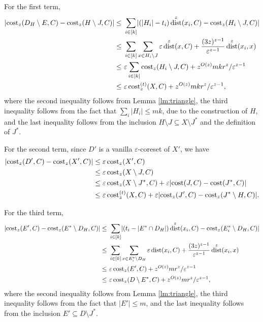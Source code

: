 \documentclass[11pt,letterpaper]{article}
\theoremstyle{definition}
\newcommand{\eps}{\varepsilon}
\DeclareMathOperator{\dist}{dist}
\DeclarePairedDelimiter{\abs}{\lvert}{\rvert}
\begin{document}
	For the first term, 
	\begin{align*}
	\abs{\cost_z(D_H\setminus E, C) - \cost_z(H\setminus J, C)}
	\leq & \ \sum_{i\in [k]} \abs{(|H_i|-t_i)\dist^z(x_i, C) - \cost_z(H_i\setminus J, C)} \\
    \leq & \ \sum_{i\in [k]} \sum_{x\in H_i\setminus J} \eps \dist^z(x, C) + \frac{(3z)^{z-1}}{\eps^{z-1}} \dist^z(x_i, x) \\
	\leq & \ \eps \sum_{i\in [k]} \cost_z(H_i\setminus J, C) + z^{O(z)} m k r^z/\eps^{z-1} \\
     \leq & \ \eps \cost[t]_z(X, C) + z^{O(z)} m k r^z/\eps^{z-1},
	\end{align*}
	where the second inequality follows from Lemma \ref{lm:triangle}, the third inequality follows from the fact that \(\sum_i |H_i| \leq mk\), due to the construction of \(H\), and the last inequality follows from the inclusion \(H\setminus J \subseteq X\setminus J^\ast\) and the definition of \(J^\ast\).

    For the second term, since $D'$ is a vanilla $\eps$-coreset of $X'$, we have
	\begin{align*}
		\abs{\cost_z(D', C) - \cost_z(X',C)} 
		&\leq \eps \cost_z(X', C) \\
		&\leq \eps \cost_z(X\setminus J, C) \\
		&\leq \eps \cost_z(X\setminus J^\ast, C) + \eps\abs{ \cost(J, C) - \cost(J^\ast, C) } \\
		&\leq \eps \cost[t]_z(X, C) + \eps\abs{ \cost_z(J',C) - \cost_z(J^\ast\setminus H,C) }.
	\end{align*}

    For the third term,
        \begin{align*}
	\abs{ \cost_z(E',C) - \cost_z(E^\ast\setminus D_H,C) }
	\leq & \ \sum_{i\in [k]} \abs{(t_i - |E^\ast\cap D_H|)\dist^z(x_i, C) - \cost_z(E^\ast_i \setminus D_H, C)} \\
    \leq & \ \sum_{i\in [k]} \sum_{x\in E^\ast_i \setminus D_H} \eps \dist(x_i, C) + \frac{(3z)^{z-1}}{\eps^{z-1}} \dist^z(x_i, x) \\
	\leq & \ \eps \cost_z(E',C) + z^{O(z)} m r^z/\eps^{z-1} \\
     \leq & \ \eps \cost_z(D\setminus E^\ast, C) + z^{O(z)} m r^z/\eps^{z-1},
	\end{align*}
        where the second inequality follows from Lemma \ref{lm:triangle}, the third inequality follows from the fact that \(|E'| \leq m\), and the last inequality follows from the inclusion \(E' \subseteq D\setminus J^\ast\).
\end{document}
